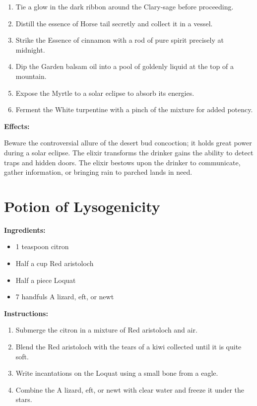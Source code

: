 \documentclass{article}
\begin{document}
\begin{enumerate}
  \item Tie a glow in the dark ribbon around the Clary-sage before proceeding.
  \item Distill the essence of Horse tail secretly and collect it in a vessel.
  \item Strike the Essence of cinnamon with a rod of pure spirit precisely at midnight.
  \item Dip the Garden balsam oil into a pool of goldenly liquid at the top of a mountain.
  \item Expose the Myrtle to a solar eclipse to absorb its energies.
  \item Ferment the White turpentine with a pinch of the mixture for added potency.
\end{enumerate}

\textbf{Effects:}

Beware the controversial allure of the desert bud concoction; it holds great power during a solar eclipse. The elixir transforms the drinker gains the ability to detect traps and hidden doors. The elixir bestows upon the drinker to communicate, gather information, or bringing rain to parched lands in need.

\newpage
\section*{Potion of Lysogenicity}

\textbf{Ingredients:}

\begin{itemize}
  \item 1 teaspoon citron
  \item Half a cup Red aristoloch
  \item Half a piece Loquat
  \item 7 handfuls A lizard, eft,  or newt
\end{itemize}

\textbf{Instructions:}

\begin{enumerate}
  \item Submerge the citron in a mixture of Red aristoloch and air.
  \item Blend the Red aristoloch with the tears of a kiwi collected until it is quite soft.
  \item Write incantations on the Loquat using a small bone from a eagle.
  \item Combine the A lizard, eft,  or newt with clear water and freeze it under the stars.
\end{enumerate}
\end{document}
